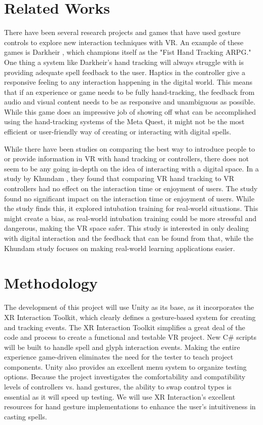 \documentclass[acmlarge]{acmart}
\begin{document}
\section{Related Works}
There have been several research projects and games that have used gesture controls to explore new interaction techniques with VR. An example of these games is Darkheir \cite{HXDF_2025}, which champions itself as the "Fist Hand Tracking ARPG." One thing a system like Darkheir's hand tracking will always struggle with is providing adequate spell feedback to the user. Haptics in the controller give a responsive feeling to any interaction happening in the digital world. This means that if an experience or game needs to be fully hand-tracking, the feedback from audio and visual content needs to be as responsive and unambiguous as possible. While this game does an impressive job of showing off what can be accomplished using the hand-tracking systems of the Meta Quest, it might not be the most efficient or user-friendly way of creating or interacting with digital spells. 

While there have been studies on comparing the best way to introduce people to or provide information in VR with hand tracking or controllers, there does not seem to be any going in-depth on the idea of interacting with a digital space. In a study by Khundam \cite{khundam2021comparative}, they found that comparing VR hand tracking to VR controllers had no effect on the interaction time or enjoyment of users. The study found no significant impact on the interaction time or enjoyment of users.  While the study finds this, it explored intubation training for real-world situations. This might create a bias, as real-world intubation training could be more stressful and dangerous, making the VR space safer. This study is interested in only dealing with digital interaction and the feedback that can be found from that, while the Khundam study focuses on making real-world learning applications easier.

\section{Methodology}
The development of this project will use Unity as its base, as it incorporates the XR Interaction Toolkit, which clearly defines a gesture-based system for creating and tracking events. The XR Interaction Toolkit simplifies a great deal of the code and process to create a functional and testable VR project. New C\# scripts will be built to handle spell and glyph interaction events. Making the entire experience game-driven eliminates the need for the tester to teach project components. Unity also provides an excellent menu system to organize testing options. Because the project investigates the comfortability and compatibility levels of controllers vs. hand gestures, the ability to swap control types is essential as it will speed up testing. We will use XR Interaction's excellent resources for hand gesture implementations to enhance the user's intuitiveness in casting spells.
\end{document}

